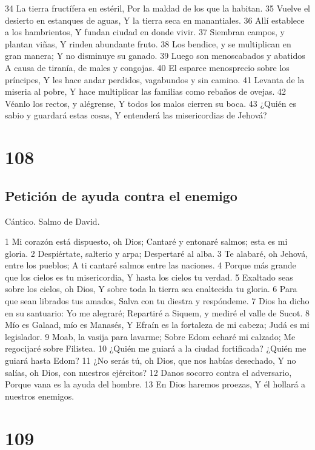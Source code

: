 34 La tierra fructífera en estéril,
Por la maldad de los que la habitan.
35 Vuelve el desierto en estanques de aguas,
Y la tierra seca en manantiales.
36 Allí establece a los hambrientos,
Y fundan ciudad en donde vivir.
37 Siembran campos, y plantan viñas,
Y rinden abundante fruto.
38 Los bendice, y se multiplican en gran manera;
Y no disminuye su ganado.
39 Luego son menoscabados y abatidos
A causa de tiranía, de males y congojas.
40 El esparce menosprecio sobre los príncipes,
Y les hace andar perdidos, vagabundos y sin camino.
41 Levanta de la miseria al pobre,
Y hace multiplicar las familias como rebaños de ovejas.
42 Véanlo los rectos, y alégrense,
Y todos los malos cierren su boca.
43 ¿Quién es sabio y guardará estas cosas,
Y entenderá las misericordias de Jehová?

\chapter{108}

\section*{Petición de ayuda contra el enemigo}

Cántico. Salmo de David.

1 Mi corazón está dispuesto, oh Dios;
Cantaré y entonaré salmos; esta es mi gloria.
2 Despiértate, salterio y arpa;
Despertaré al alba.
3 Te alabaré, oh Jehová, entre los pueblos;
A ti cantaré salmos entre las naciones.
4 Porque más grande que los cielos es tu misericordia,
Y hasta los cielos tu verdad.
5 Exaltado seas sobre los cielos, oh Dios,
Y sobre toda la tierra sea enaltecida tu gloria.
6 Para que sean librados tus amados,
Salva con tu diestra y respóndeme.
7 Dios ha dicho en su santuario: Yo me alegraré;
Repartiré a Siquem, y mediré el valle de Sucot.
8 Mío es Galaad, mío es Manasés,
Y Efraín es la fortaleza de mi cabeza;
Judá es mi legislador.
9 Moab, la vasija para lavarme;
Sobre Edom echaré mi calzado;
Me regocijaré sobre Filistea.
10 ¿Quién me guiará a la ciudad fortificada?
¿Quién me guiará hasta Edom?
11 ¿No serás tú, oh Dios, que nos habías desechado,
Y no salías, oh Dios, con nuestros ejércitos?
12 Danos socorro contra el adversario,
Porque vana es la ayuda del hombre.
13 En Dios haremos proezas,
Y él hollará a nuestros enemigos.

\chapter{109}

